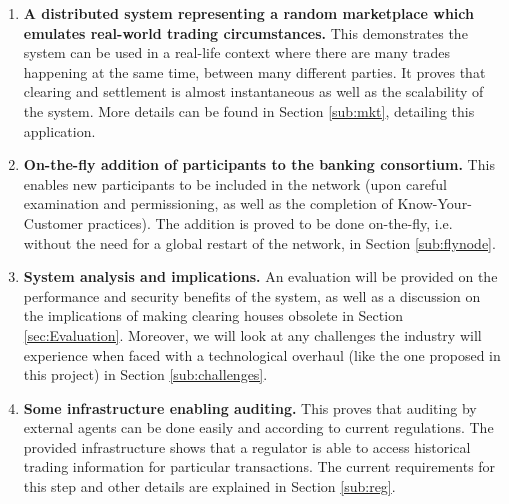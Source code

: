 \documentclass[12pt,twoside]{article}
\begin{document}
\begin{enumerate}
\item \textbf{A distributed system representing a random marketplace which emulates real-world trading circumstances.} This demonstrates the system can be used in a real-life context where there are many trades happening at the same time, between many different parties. It proves that clearing and settlement is almost instantaneous as well as the scalability of the system. More details can be found in Section \ref{sub:mkt}, detailing this application.
\item \textbf{On-the-fly addition of participants to the banking consortium.} This enables new participants to be included in the network (upon careful examination and permissioning, as well as the completion of Know-Your-Customer practices). The addition is proved to be done on-the-fly, i.e. without the need for a global restart of the network, in Section \ref{sub:flynode}.
\item \textbf{System analysis and implications.} An evaluation will be provided on the performance and security benefits of the system, as well as a discussion on the implications of making clearing houses obsolete in Section \ref{sec:Evaluation}. Moreover, we will look at any challenges the industry will experience when faced with a technological overhaul (like the one proposed in this project) in Section \ref{sub:challenges}.
\item \textbf{Some infrastructure enabling auditing.} This proves that auditing by external agents can be done easily and according to current regulations. The provided infrastructure shows that a regulator is able to access historical trading information for particular transactions. The current requirements for this step and other details are explained in Section \ref{sub:reg}.
\end{enumerate}
\newpage
\end{document}
